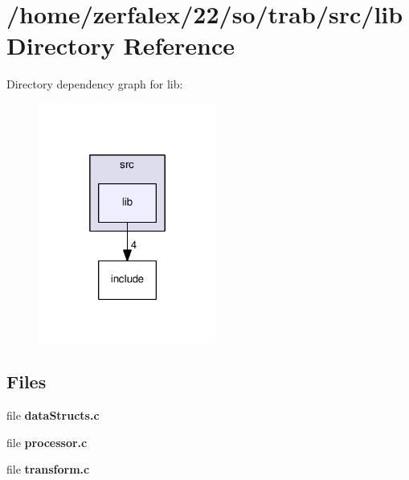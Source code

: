 \section{/home/zerfalex/22/so/trab/src/lib Directory Reference}
\label{dir_c85d3e3c5052e9ad9ce18c6863244a25}
Directory dependency graph for lib\+:\nopagebreak
\begin{figure}[H]
\begin{center}
\leavevmode
\includegraphics[width=166pt]{dir_c85d3e3c5052e9ad9ce18c6863244a25_dep}
\end{center}
\end{figure}
\subsection*{Files}
\begin{DoxyCompactItemize}
\item 
file {\bf data\+Structs.\+c}
\item 
file {\bf processor.\+c}
\item 
file {\bf transform.\+c}
\end{DoxyCompactItemize}

